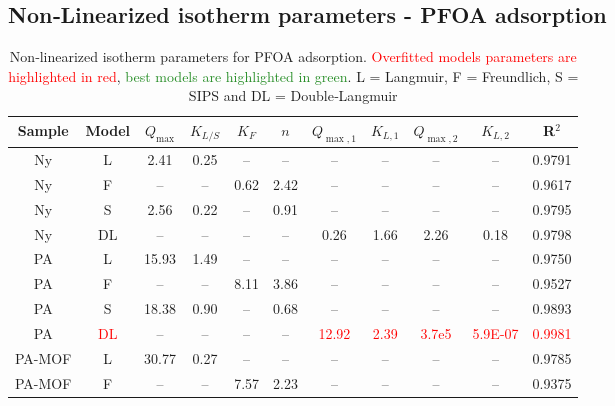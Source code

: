 \documentclass[journal=jacsat,manuscript=article]{achemso}
\begin{document}
\subsection{Non‑Linearized isotherm parameters - PFOA adsorption}
\begin{table}[H]
	\centering
	\caption{Non‑linearized isotherm parameters for PFOA adsorption.  \textcolor{red}{Overfitted models parameters are highlighted in red}, \textcolor{ForestGreen} {best models are highlighted in green}. L = Langmuir, F = Freundlich, S = SIPS and DL = Double‑Langmuir}
	\label{table:non-linearized_PFOA}
	\begin{tabular}{c | c | c c | c c | c c c c | c}
		\hline
		Sample & Model              & $Q_{\max}$ & $K_{L/S}$   & $K_F$  & $n$   & $Q_{\max,1}$ & $K_{L,1}$  & $Q_{\max,2}$ & $K_{L,2}$  & R$^2$   \\
		\hline
		\rowcolor{lime!25} Ny     & L           &  2.41      & 0.25  & –      & –     & –            & –      & –            & –         & 0.9791  \\
		Ny     & F         & –          & –     & 0.62   & 2.42  & –            & –      & –            & –         & 0.9617  \\
		Ny     & S               &  2.56      & 0.22  & –      & 0.91  & –            & –      & –            & –         & 0.9795  \\
		Ny     & DL    & –          & –     & –      & –     & 0.26         & 1.66   & 2.26         & 0.18      & 0.9798  \\
		\hline
		PA     & L           & 15.93      & 1.49  & –      & –     & –            & –      & –            & –         & 0.9750  \\
		PA     & F         & –          & –     & 8.11   & 3.86  & –            & –      & –            & –         & 0.9527  \\
		\rowcolor{lime!25} PA     & S               & 18.38      & 0.90  & –      & 0.68  & –            & –      & –            & –         & 0.9893  \\
		PA     & \textcolor{red}{DL}
		& –          & –     & –      & –     & \textcolor{red}{12.92}
		& \textcolor{red}{2.39}
		& \textcolor{red}{3.7e5}
		& \textcolor{red}{5.9E-07}
		& \textcolor{red}{0.9981} \\
		\hline
		PA-MOF  & L           & 30.77      & 0.27  & –      & –     & –            & –      & –            & –         & 0.9785  \\
		PA-MOF  & F         & –          & –     & 7.57   & 2.23  & –            & –      & –            & –         & 0.9375  \\

\end{tabular}
\end{table}
\end{document}
